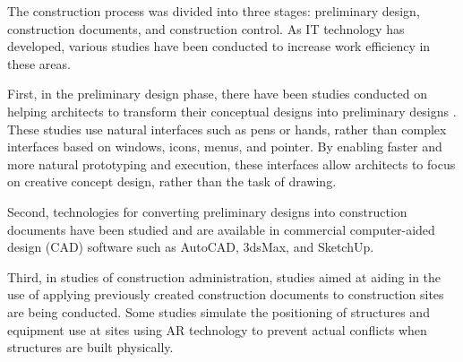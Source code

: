 \begin{comment}
In using wearable computing devices, there are big benefits that additional information can be gained in an environment giving freedom to use of both hands and an increased degree of immersion. However, interfaces to reflect amended matters on-site pose a challenge and previous methods have proved to be inconvenient or not available at all. Song, et al. \cite{song_penlight:_2009, song_mouselight:_2010} solved input interface problems using interactive surface technology. In the study, minimization of projectors was predicted and therefore, through it, by proposing a small projector concept possible to be attached to a pen or with a mouse type, using the projector attached to this pen, information of blueprints were made to be acquired and necessary amended matters were made to be renewed. Nonetheless, because this study is limited to 2D surface, it was difficult to get 3D information of structures or access them.
\end{comment}


The construction process was divided into three stages: preliminary design, construction documents, and construction control. As IT technology has developed, various studies have been conducted to increase work efficiency in these areas.

First, in the preliminary design phase, there have been studies conducted on helping architects to transform their conceptual designs into preliminary designs \cite{bae_ilovesketch:_2008, igarashi_teddy:_2007}. These studies use natural interfaces such as pens or hands, rather than complex interfaces based on windows, icons, menus, and pointer. By enabling faster and more natural prototyping and execution, these interfaces allow architects to focus on creative concept design, rather than the task of drawing.

Second, technologies for converting preliminary designs into construction documents have been studied and are available in commercial computer-aided design (CAD) software such as AutoCAD, 3dsMax, and SketchUp.

Third, in studies of construction administration, studies aimed at aiding in the use of applying previously created construction documents to construction sites are being conducted. Some studies \cite{behzadan_enabling_2013, kim_interactive_2012} simulate the positioning of structures and equipment use at sites using AR technology to prevent actual conflicts when structures are built physically.

